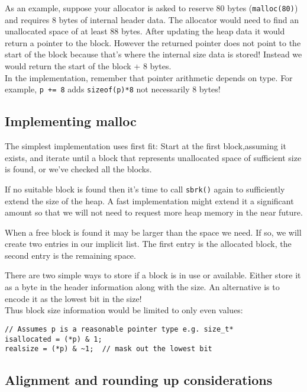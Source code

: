 As an example, suppose your allocator is asked to reserve 80 bytes
(\texttt{malloc(80)}) and requires 8 bytes of internal header data. The
allocator would need to find an unallocated space of at least 88 bytes.
After updating the heap data it would return a pointer to the block.
However the returned pointer does not point to the start of the block
because that's where the internal size data is stored! Instead we would
return the start of the block + 8 bytes.\\In the implementation,
remember that pointer arithmetic depends on type. For example,
\texttt{p\ +=\ 8} adds \texttt{sizeof(p)*8} not necessarily 8 bytes!

\subsection{Implementing malloc}\label{implementing-malloc}

The simplest implementation uses first fit: Start at the first
block,assuming it exists, and iterate until a block that represents
unallocated space of sufficient size is found, or we've checked all the
blocks.

If no suitable block is found then it's time to call \texttt{sbrk()}
again to sufficiently extend the size of the heap. A fast implementation
might extend it a significant amount so that we will not need to request
more heap memory in the near future.

When a free block is found it may be larger than the space we need. If
so, we will create two entries in our implicit list. The first entry is
the allocated block, the second entry is the remaining space.

There are two simple ways to store if a block is in use or available.
Either store it as a byte in the header information along with the size.
An alternative is to encode it as the lowest bit in the size!\\Thus
block size information would be limited to only even values:

\begin{verbatim}
// Assumes p is a reasonable pointer type e.g. size_t*
isallocated = (*p) & 1;
realsize = (*p) & ~1;  // mask out the lowest bit
\end{verbatim}

\subsection{Alignment and rounding up
considerations}\label{alignment-and-rounding-up-considerations}

